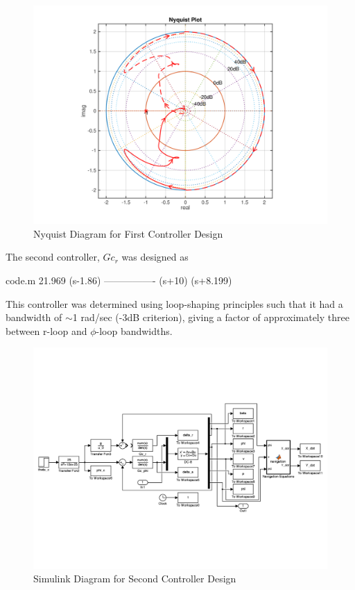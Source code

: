 \documentclass[12pt]{article}
\begin{document}
\begin{figure}[h!]
\begin{center}
\includegraphics[height=.425\textheight]{figures/phi_nyquist2}
\caption{Nyquist Diagram for First Controller Design}
\end{center}
\end{figure}

\noindent The second controller, $Gc_r$ was designed as
\begin{filecontents*}{code.m}
  21.969 (s-1.86)
  ----------------
  (s+10) (s+8.199)
\end{filecontents*}


\noindent This controller was determined using loop-shaping principles such that it had a bandwidth of $\sim$1 rad/sec (-3dB criterion), giving a factor of approximately three between r-loop and $\phi$-loop bandwidths. \\

\begin{figure}[h!]
\begin{center}
\includegraphics[height=.425\textheight]{figures/second_controller_simulink}
\caption{Simulink Diagram for Second Controller Design}
\end{center}
\end{figure}
\end{document}
